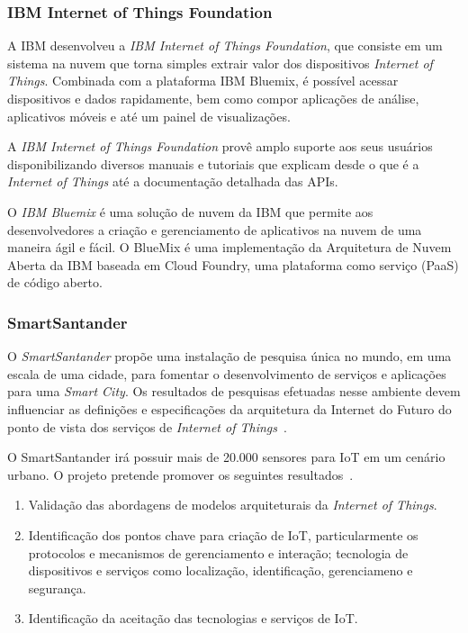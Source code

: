 \subsubsection{IBM Internet of Things Foundation}
A IBM desenvolveu a \textit{IBM Internet of Things Foundation}, que consiste em um sistema na nuvem que torna simples
extrair valor dos dispositivos \textit{Internet of Things}. Combinada com a plataforma IBM Bluemix\texttrademark,
é possível acessar dispositivos e dados rapidamente, bem como compor aplicações de análise, aplicativos móveis 
e até um painel de visualizações.

A \textit{IBM Internet of Things Foundation} provê amplo suporte aos seus usuários
disponibilizando diversos manuais e tutoriais que explicam desde o que é a \textit{Internet of Things}
até a documentação detalhada das APIs.

O \textit{IBM Bluemix} é uma solução de nuvem da IBM que permite aos desenvolvedores a criação
e gerenciamento de aplicativos na nuvem de uma maneira ágil e fácil.
O BlueMix é uma implementação da Arquitetura de Nuvem Aberta da IBM baseada em Cloud Foundry, uma plataforma como serviço (PaaS) de código aberto.

\subsubsection{SmartSantander}
O \textit{SmartSantander} propõe uma instalação de pesquisa única no mundo, em uma escala de uma cidade,
para fomentar o desenvolvimento de serviços e aplicações para uma \textit{Smart City}.
Os resultados de pesquisas efetuadas nesse ambiente devem influenciar as definições e especificações da arquitetura da
Internet do Futuro do ponto de vista dos serviços de \textit{Internet of Things}~\cite{citeulike:13508566}.

O SmartSantander irá possuir mais de 20.000 sensores para IoT em um cenário urbano. O projeto pretende promover os
seguintes resultados~\cite{smartsantandersite}.
\begin{enumerate}
\item Validação das abordagens de modelos arquiteturais da \textit{Internet of Things}.
\item Identificação dos pontos chave para criação de IoT, particularmente os protocolos e mecanismos de gerenciamento e
interação; tecnologia de dispositivos e serviços como localização, identificação, gerenciameno e segurança.
\item Identificação da aceitação das tecnologias e serviços de IoT.
\end{enumerate}

